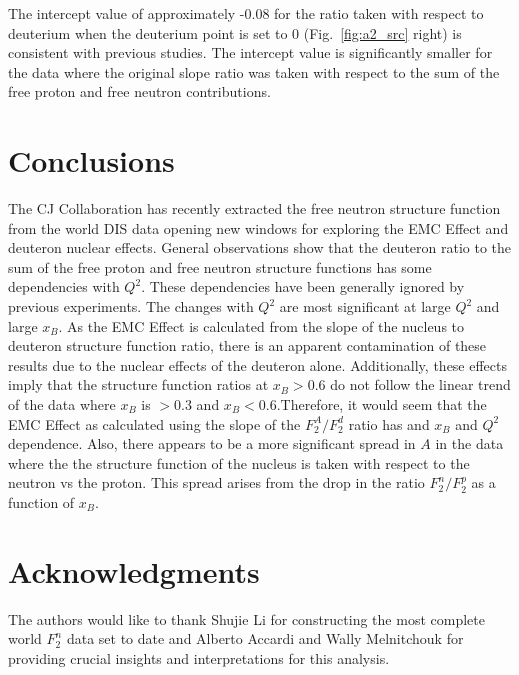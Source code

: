 \documentclass[oneside]{article}
\begin{document}
The intercept value of approximately -0.08 for the ratio taken with respect to deuterium when the deuterium point is set to 0 (Fig.~\ref{fig:a2_src} right) is consistent with previous studies. The intercept value is significantly smaller for the data where the original slope ratio was taken with respect to the sum of the free proton and free neutron contributions. 

\section{Conclusions}

The CJ Collaboration has recently extracted the free neutron structure function from the world DIS data opening new windows for exploring the EMC Effect and deuteron nuclear effects. General observations show that the deuteron ratio to the sum of the free proton and free neutron structure functions has some dependencies with $Q^2$. These dependencies have been generally ignored by previous experiments. The changes with $Q^2$ are most significant at large $Q^2$ and large $x_B$. As the EMC Effect is calculated from the slope of the nucleus to deuteron structure function ratio, there is an apparent contamination of these results due to the nuclear effects of the deuteron alone. Additionally, these effects imply that the structure function ratios at $x_B>0.6$ do not follow the linear trend of the data where $x_B$ is $>0.3$ and $x_B<0.6$.Therefore, it would seem that the EMC Effect as calculated using the slope of the $F_2^A/F_2^d$ ratio has and $x_B$ and $Q^2$ dependence. Also, there appears to be a more significant spread in $A$ in the data where the the structure function of the nucleus is taken with respect to the neutron vs the proton. This spread arises from the drop in the ratio $F_2^n/F_2^p$ as a function of $x_B$. 

\section{Acknowledgments}

The authors would like to thank Shujie Li for constructing the most complete world $F_2^n$ data set to date and Alberto Accardi and Wally Melnitchouk for providing crucial insights and interpretations for this analysis.  

\end{document}
